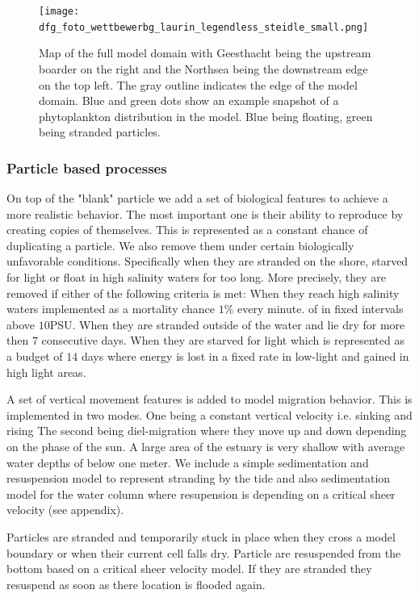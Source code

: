 \begin{figure}
    \texttt{[image: dfg\_foto\_wettbewerbg\_laurin\_legendless\_steidle\_small.png]}
    \caption{Map of the full model domain with Geesthacht being the upstream boarder on the right and the Northsea being the downstream edge on the top left. The gray outline indicates the edge of the model domain. Blue and green dots show an example snapshot of a phytoplankton distribution in the model. Blue being floating, green being stranded particles.}
    \label{fig:model_domain}
\end{figure}

\subsubsection*{Particle based processes}

On top of the "blank" particle we add a set of biological features to achieve a more realistic behavior.
The most important one is their ability to reproduce by creating copies of themselves.
This is represented as a constant chance of duplicating a particle.
We also remove them under certain biologically unfavorable conditions. Specifically when they are stranded on the shore, starved for light or float in high salinity waters for too long.
More precisely, they are removed if either of the following criteria is met: 
When they reach high salinity waters implemented as a mortality chance $1\%$ every minute.
of  in fixed intervals above $10$PSU.
When they are stranded outside of the water and lie dry for more then $7$ consecutive days.
When they are starved for light which is represented as a budget of $14$ days 
where energy is lost in a fixed rate in low-light and gained in high light areas.

A set of vertical movement features is added to model migration behavior. 
This is implemented in two modes. 
One being a constant vertical velocity i.e. sinking and rising
The second being diel-migration where they move up and down depending on the phase of the sun.
A large area of the estuary is very shallow with average water depths of below one meter. 
We include a simple sedimentation and resuspension model to represent stranding by the tide and also sedimentation model for the water column where resupension is depending on a critical sheer velocity (see appendix).

Particles are stranded and temporarily stuck in place when they cross a model boundary or when their current cell falls dry. 
Particle are resuspended from the bottom based on a critical sheer velocity model.
If they are stranded they resuspend as soon as there location is flooded again.

